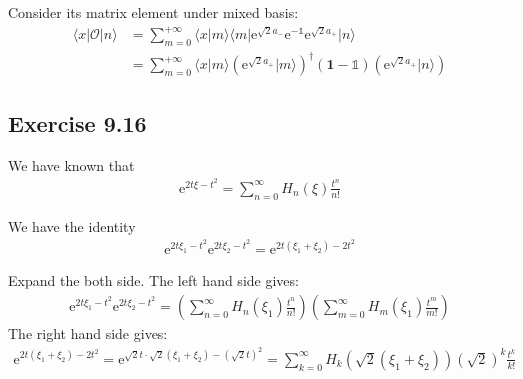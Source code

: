 \documentclass[]{ctexart}
\newcommand{\me}{\mathrm{e}}
\begin{document}
		Consider its matrix element under mixed basis:
			\begin{equation*}
			\begin{aligned}
				\langle x | \mathcal{O} | n\rangle&=\sum_{m=0}^{+\infty}\langle x |m\rangle \langle m| \me^{\sqrt{2}a_-}\me^{-\mathds{1}}\me^{\sqrt{2}a_+}| n\rangle\\
				&=\sum_{m=0}^{+\infty}\langle x |m\rangle\left(\me^{\sqrt{2}a_+}|m\rangle\right)^{\dagger}\left(\mathbf{1}-\mathds{1}\right)\left(\me^{\sqrt{2}a_+}|n\rangle\right)
			\end{aligned}
			\end{equation*}
		
	
	\subsection{Exercise 9.16}
		We have known that
			\begin{equation*}
			\begin{aligned}
				\me^{2t\xi-t^2}=\sum_{n=0}^{\infty}H_n(\xi)\frac{t^n}{n!}
			\end{aligned}
			\end{equation*}
		
		We have the identity
			\begin{equation*}
			\begin{aligned}
				\me^{2t\xi_1-t^2}\me^{2t\xi_2-t^2}=\me^{2t(\xi_1+\xi_2)-2t^2}
			\end{aligned}
			\end{equation*}
			
		Expand the both side. The left hand side gives:
			\begin{equation*}
			\begin{aligned}
				\me^{2t\xi_1-t^2}\me^{2t\xi_2-t^2}=\left(\sum_{n=0}^{\infty}H_n(\xi_1)\frac{t^n}{n!}\right)\left(\sum_{m=0}^{\infty}H_m(\xi_1)\frac{t^m}{m!}\right)
			\end{aligned}
			\end{equation*}
		The right hand side gives:
			\begin{equation*}
			\begin{aligned}
				\me^{2t(\xi_1+\xi_2)-2t^2}=\me^{\sqrt{2}t\cdot\sqrt{2}(\xi_1+\xi_2)-(\sqrt{2}t)^2}=\sum_{k=0}^{\infty}H_k(\sqrt{2}(\xi_1+\xi_2))(\sqrt{2})^k\frac{t^k}{k!}
			\end{aligned}
			\end{equation*}
			
\end{document}
